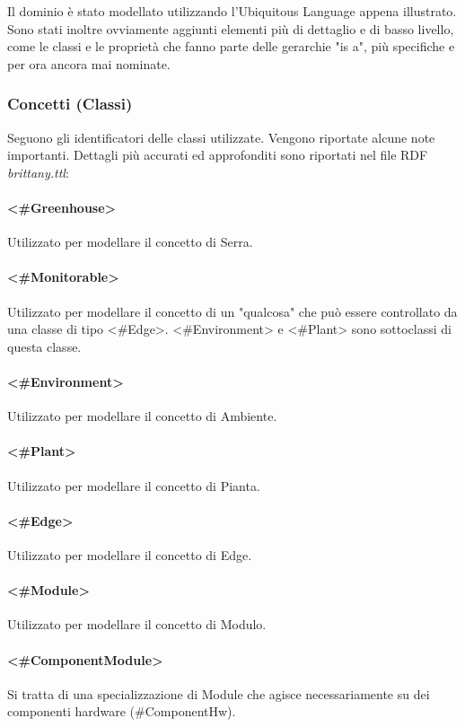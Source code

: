 
\noindent Il dominio è stato modellato utilizzando l'Ubiquitous Language appena illustrato. Sono stati inoltre ovviamente aggiunti elementi più di dettaglio e di basso livello, come le classi e le proprietà che fanno parte delle gerarchie "is a", più specifiche e per ora ancora mai nominate.
\subsubsection{Concetti (Classi)}
Seguono gli identificatori delle classi utilizzate. Vengono riportate alcune note importanti. Dettagli più accurati ed approfonditi sono riportati nel file RDF \textit{brittany.ttl}:

\paragraph{<\#Greenhouse>}
Utilizzato per modellare il concetto di Serra.
\paragraph{<\#Monitorable>}
Utilizzato per modellare il concetto di un "qualcosa" che può essere controllato da una classe di tipo <\#Edge>. <\#Environment> e <\#Plant> sono sottoclassi di questa classe.
\paragraph{<\#Environment>}
Utilizzato per modellare il concetto di Ambiente.
\paragraph{<\#Plant>}
Utilizzato per modellare il concetto di Pianta.
\paragraph{<\#Edge>}
Utilizzato per modellare il concetto di Edge.
\paragraph{<\#Module>}
Utilizzato per modellare il concetto di Modulo.
\paragraph{<\#ComponentModule>}
Si tratta di una specializzazione di Module che agisce necessariamente su dei componenti hardware (\#ComponentHw).
